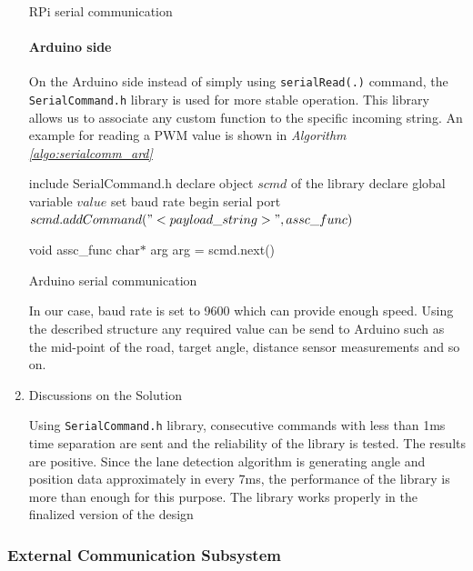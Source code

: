 \documentclass[a4paper,12pt]{article}
\begin{document}
\begin{enumerate}
\begin{algorithm}
			\caption{RPi serial communication\label{algo:serialcomm_pi}}
		\end{algorithm}

	\paragraph*{Arduino side}
	
	On the Arduino side instead of simply using \lstinline[language=Arduino]|serialRead(.)| command,  the \lstinline[language=Arduino]|SerialCommand.h| library is used for more stable operation. This library allows us to associate any custom function to the specific incoming string.  An example for reading a PWM value is shown in \textit{Algorithm \ref{algo:serialcomm_ard}}
	
	\begin{algorithm}
		\DontPrintSemicolon
		include SerialCommand.h \;
		declare object $scmd$ of the library \;
		declare global variable $value$ \;
		set baud rate \;
		begin serial port\;
		$scmd.addCommand("<payload\_string>",assc\_func)$ \;\;
		
		void assc\_func{\;
			char$*$ arg \;
			arg = scmd.next() \;
			}
		\caption{Arduino serial communication\label{algo:serialcomm_ard}}
	\end{algorithm}	 
	
		In our case, baud rate is set to 9600 which can provide enough speed. Using the described structure any required value can be send to Arduino such as the mid-point of the road, target angle, distance sensor measurements and so on.
		

	\item {Discussions on the Solution}

		Using \lstinline[language=Arduino]|SerialCommand.h| library, consecutive commands with less than 1ms time separation are sent and the reliability of the library is tested. The results are positive. Since the lane detection algorithm is generating angle and position data approximately in every 7ms, the performance of the library is more than enough for this purpose. The library works properly in the finalized version of the design 			

	\end{enumerate}




\subsubsection{External Communication Subsystem}	
\end{document}
